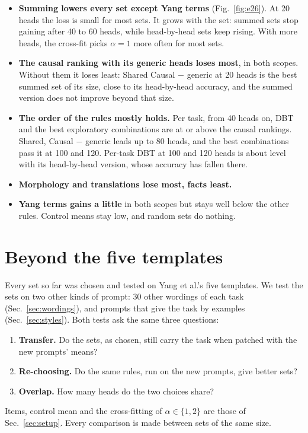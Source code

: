 \documentclass[10pt,a4paper]{article}
\begin{document}
\begin{itemize}
\item \textbf{Summing lowers every set except Yang terms} (Fig.~\ref{fig:e26}). At 20 heads the loss is small for most sets. It grows with the set: summed sets stop gaining after 40 to 60 heads, while head-by-head sets keep rising. With more heads, the cross-fit picks $\alpha=1$ more often for most sets.
\item \textbf{The causal ranking with its generic heads loses most}, in both scopes. Without them it loses least: Shared Causal $-$ generic at 20 heads is the best summed set of its size, close to its head-by-head accuracy, and the summed version does not improve beyond that size.
\item \textbf{The order of the rules mostly holds.} Per task, from 40 heads on, DBT and the best exploratory combinations are at or above the causal rankings. Shared, Causal $-$ generic leads up to 80 heads, and the best combinations pass it at 100 and 120. Per-task DBT at 100 and 120 heads is about level with its head-by-head version, whose accuracy has fallen there.
\item \textbf{Morphology and translations lose most, facts least.}
\item \textbf{Yang terms gains a little} in both scopes but stays well below the other rules. Control means stay low, and random sets do nothing.
\end{itemize}

\section{Beyond the five templates}\label{sec:beyond}

Every set so far was chosen and tested on Yang et al.'s five templates. We test the sets on two other kinds of prompt: 30 other wordings of each task (Sec.~\ref{sec:wordings}), and prompts that give the task by examples (Sec.~\ref{sec:styles}). Both tests ask the same three questions:
\begin{enumerate}
\item \textbf{Transfer.} Do the sets, as chosen, still carry the task when patched with the new prompts' means?
\item \textbf{Re-choosing.} Do the same rules, run on the new prompts, give better sets?
\item \textbf{Overlap.} How many heads do the two choices share?
\end{enumerate}
Items, control mean and the cross-fitting of $\alpha\in\{1,2\}$ are those of Sec.~\ref{sec:setup}. Every comparison is made between sets of the same size.
\end{document}
